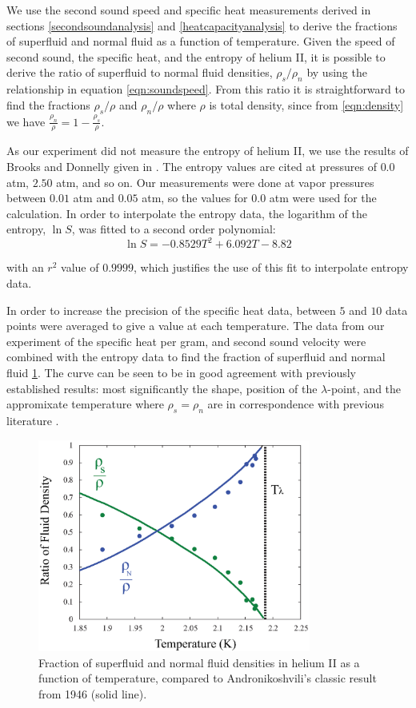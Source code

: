 We use the second sound speed and specific heat measurements derived
in sections \ref{secondsoundanalysis} and \ref{heatcapacityanalysis}
to derive the fractions of superfluid and normal fluid as a function
of temperature. Given the speed of second sound, the specific heat,
and the entropy of helium II, it is possible to derive the ratio of
superfluid to normal fluid densities, $\rho_s/\rho_n$ by using the
relationship in equation \ref{eqn:soundspeed}. From this ratio it is
straightforward to find the fractions $\rho_s/\rho$ and $\rho_n/\rho$
where $\rho$ is total density, since from \ref{eqn:density} we have
$\frac{\rho_n}{\rho} = 1 - \frac{\rho_s}{\rho}$.

As our experiment did not measure the entropy of helium II, we use the
results of Brooks and Donnelly given in \cite{brooks}. The entropy
values are cited at pressures of $0.0$ atm, $2.50$ atm, and so on. Our
measurements were done at vapor pressures between $0.01$ atm and
$0.05$ atm, so the values for $0.0$ atm were used for the calculation.
In order to interpolate the entropy data, the logarithm of the
entropy, $\ln S$, was fitted to a second order polynomial:
\begin{equation}
\ln S = -0.8529T^2 + 6.092T - 8.82
\end{equation}

with an $r^2$ value of $0.9999$, which justifies the use of this fit
to interpolate entropy data.

In order to increase the precision of the specific heat data, between
$5$ and $10$ data points were averaged to give a value at each
temperature. The data from our experiment of the specific heat per
gram, and second sound velocity were combined with the entropy data to
find the fraction of superfluid and normal fluid
\ref{fig:density}. The curve can be seen to be in good agreement with
previously established results: most significantly the shape, position
of the $\lambda$-point, and the appromixate temperature where $\rho_s
= \rho_n$ are in correspondence with previous literature \cite{andro}.

\begin{figure}[htbp]
\begin{center}
\includegraphics[height=70mm]{./figures/density.eps}
\caption{\small{Fraction of superfluid and normal fluid densities in
    helium II as a function of temperature, compared to
    Andronikoshvili's classic result from 1946 (solid
    line)\cite{andro}.}}
\label{fig:density}
\end{center}
\end{figure}
